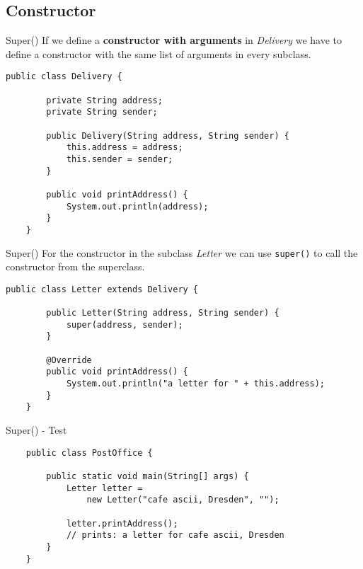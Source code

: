 \subsection{Constructor}
\begin{frame}[fragile]{Super()}
    If we define a \textbf{constructor with arguments} in \emph{Delivery} we have to define a constructor
    with the same list of arguments in every subclass.
    \begin{lstlisting}[basicstyle=\ttfamily\scriptsize]
    public class Delivery {
    
        private String address;
        private String sender;
        
        public Delivery(String address, String sender) {
            this.address = address;
            this.sender = sender;
        }
                
        public void printAddress() {
            System.out.println(address);
        }
    } \end{lstlisting}
\end{frame}

\begin{frame}[fragile]{Super()}
    For the constructor in the subclass \emph{Letter} we can use \texttt{super()} to call the constructor
    from the superclass.
    \begin{lstlisting}[escapechar=!]
    public class Letter extends Delivery {

        public Letter(String address, String sender) {
            super(address, sender);
        }
    
        @Override
        public void printAddress() {
            System.out.println("a letter for " + this.address);    
        }    
    }\end{lstlisting}
\end{frame}

\begin{frame}[fragile]{Super() - Test}
    \begin{lstlisting}
    public class PostOffice {
        
        public static void main(String[] args) {        
            Letter letter = 
                new Letter("cafe ascii, Dresden", "");
            
            letter.printAddress();
            // prints: a letter for cafe ascii, Dresden
        }
    } \end{lstlisting}
\end{frame}


